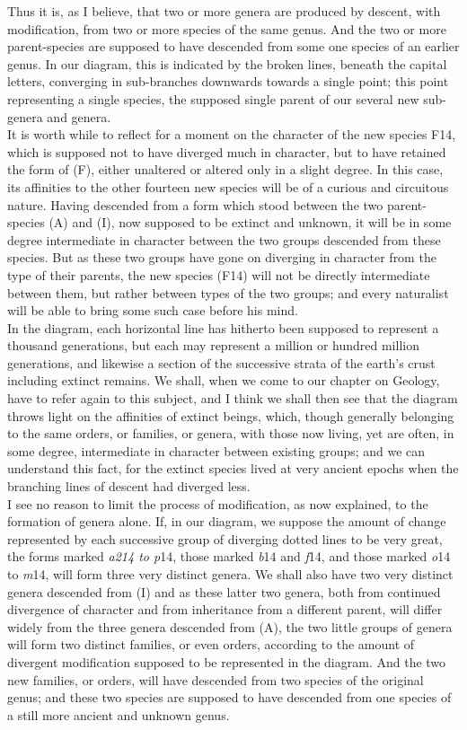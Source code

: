 \indent Thus it is, as I believe, that two or more genera are produced by descent, with modification, from two or more species of the same genus. And the two or more parent-species are supposed to have descended from some one species of an earlier genus. In our diagram, this is indicated by the broken lines, beneath the capital letters, converging in sub-branches downwards towards a single point; this point representing a single species, the supposed single parent of our several new sub-genera and genera. \\
\indent It is worth while to reflect for a moment on the character of the new species F14, which is supposed not to have diverged much in character, but to have retained the form of (F), either unaltered or altered only in a slight degree. In this case, its affinities to the other fourteen new species will be of a curious and circuitous nature.  Having descended from a form which stood between the two parent-species (A) and (I), now supposed to be extinct and unknown, it will be in some degree intermediate in character between the two groups descended from these species. But as these two groups have gone on diverging in character from the type of their parents, the new species (F14) will not be directly intermediate between them, but rather between types of the two groups; and every naturalist will be able to bring some such case before his mind. \\
\indent In the diagram, each horizontal line has hitherto been supposed to represent a thousand generations, but each may represent a million or hundred million generations, and likewise a section of the successive strata of the earth's crust including extinct remains. We shall, when we come to our chapter on Geology, have to refer again to this subject, and I think we shall then see that the diagram throws light on the affinities of extinct beings, which, though generally belonging to the same orders, or families, or genera, with those now living, yet are often, in some degree, intermediate in character between existing groups; and we can understand this fact, for the extinct species lived at very ancient epochs when the branching lines of descent had diverged less. \\
\indent I see no reason to limit the process of modification, as now explained, to the formation of genera alone. If, in our diagram, we suppose the amount of change represented by each successive group of diverging dotted lines to be very great, the forms marked \emph{a214 to p}14, those marked \emph{b}14 and \emph{f}14, and those marked \emph{o}14 to \emph{m}14, will form three very distinct genera. We shall also have two very distinct genera descended from (I) and as these latter two genera, both from continued divergence of character and from inheritance from a different parent, will differ widely from the three genera descended from (A), the two little groups of genera will form two distinct families, or even orders, according to the amount of divergent modification supposed to be represented in the diagram. And the two new families, or orders, will have descended from two species of the original genus; and these two species are supposed to have descended from one species of a still more ancient and unknown genus. \\
